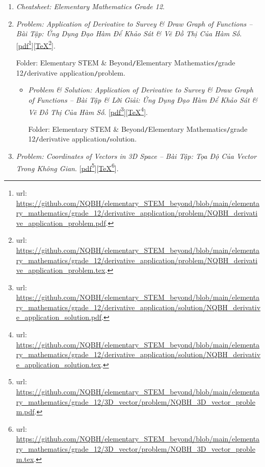 \documentclass[12pt,oneside]{book}
\begin{document}
\begin{enumerate}
	\item {\it Cheatsheet: Elementary Mathematics Grade 12}.
	\item {\it Problem: Application of Derivative to Survey \& Draw Graph of Functions -- Bài Tập: Ứng Dụng Đạo Hàm Để Khảo Sát \& Vẽ Đồ Thị Của Hàm Số}. [\href{https://github.com/NQBH/elementary_STEM_beyond/blob/main/elementary_mathematics/grade_12/derivative_application/problem/NQBH_derivative_application_problem.pdf}{pdf}\footnote{{\sc url}: \url{https://github.com/NQBH/elementary_STEM_beyond/blob/main/elementary_mathematics/grade_12/derivative_application/problem/NQBH_derivative_application_problem.pdf}.}][\href{https://github.com/NQBH/elementary_STEM_beyond/blob/main/elementary_mathematics/grade_12/derivative_application/problem/NQBH_derivative_application_problem.tex}{\TeX}\footnote{{\sc url}: \url{https://github.com/NQBH/elementary_STEM_beyond/blob/main/elementary_mathematics/grade_12/derivative_application/problem/NQBH_derivative_application_problem.tex}.}].
	
	Folder: {\sf Elementary STEM \& Beyond{\tt/}Elementary Mathematics{\tt/}grade 12{\tt/}derivative application{\tt/}problem}.
	\begin{itemize}
		\item {\it Problem \& Solution: Application of Derivative to Survey \& Draw Graph of Functions -- Bài Tập \& Lời Giải: Ứng Dụng Đạo Hàm Để Khảo Sát \& Vẽ Đồ Thị Của Hàm Số}. [\href{https://github.com/NQBH/elementary_STEM_beyond/blob/main/elementary_mathematics/grade_12/derivative_application/solution/NQBH_derivative_application_solution.pdf}{pdf}\footnote{{\sc url}: \url{https://github.com/NQBH/elementary_STEM_beyond/blob/main/elementary_mathematics/grade_12/derivative_application/solution/NQBH_derivative_application_solution.pdf}.}][\href{https://github.com/NQBH/elementary_STEM_beyond/blob/main/elementary_mathematics/grade_12/derivative_application/solution/NQBH_derivative_application_solution.tex}{\TeX}\footnote{{\sc url}: \url{https://github.com/NQBH/elementary_STEM_beyond/blob/main/elementary_mathematics/grade_12/derivative_application/solution/NQBH_derivative_application_solution.tex}.}].
		
		Folder: {\sf Elementary STEM \& Beyond{\tt/}Elementary Mathematics{\tt/}grade 12{\tt/}derivative application{\tt/}solution}.
	\end{itemize}
	\item {\it Problem: Coordinates of Vectors in 3D Space -- Bài Tập: Tọa Độ Của Vector Trong Không Gian}. [\href{https://github.com/NQBH/elementary_STEM_beyond/blob/main/elementary_mathematics/grade_12/3D_vector/problem/NQBH_3D_vector_problem.pdf}{pdf}\footnote{{\sc url}: \url{https://github.com/NQBH/elementary_STEM_beyond/blob/main/elementary_mathematics/grade_12/3D_vector/problem/NQBH_3D_vector_problem.pdf}.}][\href{https://github.com/NQBH/elementary_STEM_beyond/blob/main/elementary_mathematics/grade_12/3D_vector/problem/NQBH_3D_vector_problem.tex}{\TeX}\footnote{{\sc url}: \url{https://github.com/NQBH/elementary_STEM_beyond/blob/main/elementary_mathematics/grade_12/3D_vector/problem/NQBH_3D_vector_problem.tex}.}].
	

\end{enumerate}
\end{document}
